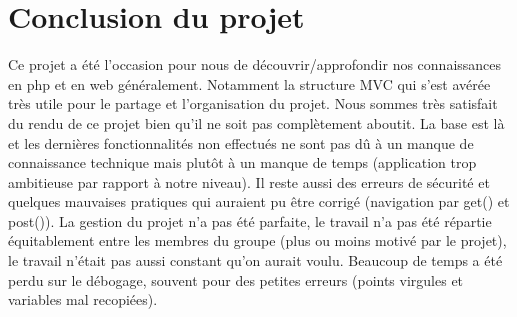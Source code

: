 \documentclass[a4paper,12pt,abstracton,titlepage]{scrartcl}
\begin{document}
\section{Conclusion du projet}
Ce projet a été l'occasion pour nous de découvrir/approfondir nos connaissances en php et en web généralement. Notamment la structure MVC qui s'est avérée très utile pour le partage et l'organisation du projet. Nous sommes très satisfait du rendu de ce projet bien qu'il ne soit pas complètement aboutit. La base est là et les dernières fonctionnalités non effectués ne sont pas dû à un manque de connaissance technique mais plutôt à un manque de temps (application trop ambitieuse par rapport à notre niveau). Il reste aussi des erreurs de sécurité et quelques mauvaises pratiques qui auraient pu être corrigé (navigation par get() et post()). La gestion du projet n'a pas été parfaite, le travail n'a pas été répartie équitablement entre les membres du groupe (plus ou moins motivé par le projet), le travail n'était pas aussi constant qu'on aurait voulu. Beaucoup de temps a été perdu sur le débogage, souvent pour des petites erreurs (points virgules et variables mal recopiées).











\end{document}

